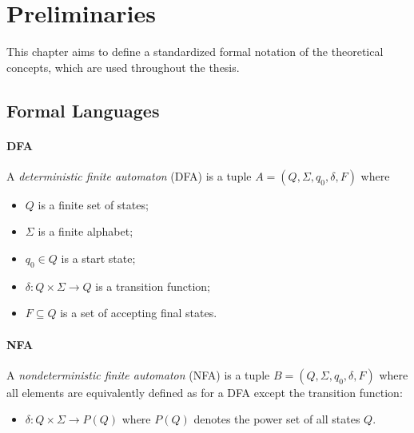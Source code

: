 \chapter{Preliminaries}\label{chapter:preliminaries}
This chapter aims to define a standardized formal notation of the theoretical concepts, which are used throughout the thesis.


\section{Formal Languages}

\subsubsection{DFA}
A \emph{deterministic finite automaton} (DFA) is a tuple $A = (Q, \Sigma, q_{0},\delta,F)$ where
\begin{itemize}[-,noitemsep]
\item $Q$ is a finite set of states;
\item $\Sigma$ is a finite alphabet;
\item $q_{0} \in Q$ is a start state;
\item $\delta : Q \times \Sigma \rightarrow Q$ is a transition function;
\item $F \subseteq Q$ is a set of accepting final states.
\end{itemize}

\subsubsection{NFA}
A \emph{nondeterministic finite automaton} (NFA) is a tuple $B = (Q, \Sigma, q_{0},\delta,F)$ where all elements are equivalently defined as for a DFA except the transition function:
\begin{itemize}[-,noitemsep]
\item $\delta : Q \times \Sigma \rightarrow P(Q)$ where $P(Q)$ denotes the power set of all states $Q$.
\end{itemize}

